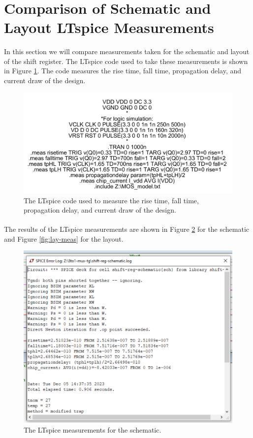 \documentclass{article}
\begin{document}
\section{Comparison of Schematic and Layout LTspice Measurements}
  \paragraph{}
  In this section we will compare measurements taken for the schematic and layout of the shift register. The LTspice code used to take these measurements is shown in Figure \ref{fig:spice-meas}. The code measures the rise time, fall time, propagation delay, and current draw of the design.

  \begin{figure}[H]
    \centering
    \includegraphics[width=0.7\linewidth, frame]{screenshots/spice-meas.png}
    \caption{The LTspice code used to measure the rise time, fall time, propagation delay, and current draw of the design.}
    \label{fig:spice-meas}
  \end{figure}
  
  \paragraph{}
  The results of the LTspice measurements are shown in Figure \ref{fig:schem-meas} for the schematic and Figure \ref{fig:lay-meas} for the layout.

  \begin{figure}[H]
    \centering
    \includegraphics[width=0.7\linewidth, frame]{screenshots/schem-meas.png}
    \caption{The LTspice measurements for the schematic.}
    \label{fig:schem-meas}
  \end{figure}
\end{document}
